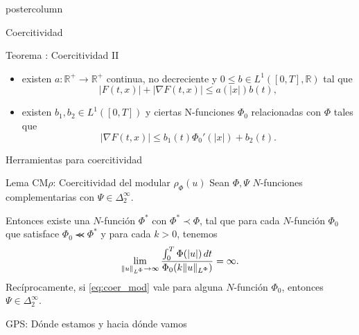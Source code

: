 \documentclass[final,hyperref={pdfpagelabels=false}]{beamer}
\begin{document}
\begin{frame}
\begin{columns}
\begin{column}{.49\textwidth}
\begin{beamercolorbox}[center,wd=\textwidth]{postercolumn}
\begin{minipage}[T]{.95\textwidth}
{\begin{block}{Coercitividad}
\begin{minipage}[T]{.9\textwidth}
\begin{block}{Teorema \cite{acmaz2015}: Coercitividad II}
\begin{itemize}
\item existen $a:\mathbb{R}^+\to \mathbb{R}^+$ continua, no decreciente y $0\leq b \in L^{1}([0,T],\mathbb{R})$ tal que 
\begin{equation}\label{item:condicion_cya}
|F(t,x)|+|\nabla F(t,x)|\leq a(|x|)b(t),\tag{$C\; y\; A$}
\end{equation}
\item existen $b_1,b_2 \in L^1([0,T])$ y ciertas N-funciones $\Phi_0$ relacionadas con $\Phi$ tales que 
\begin{equation}\label{holder_cont-mu}
  \left| \nabla F(t,x) \right|\leq b_1(t)\Phi_0'(|x|)+b_2(t).
  \tag{$A_5$}
\end{equation}
\end{itemize}
\end{block}
\end{minipage}
\end{block}




\begin{block}{Herramientas para coercitividad}
	\begin{minipage}[T]{.9\textwidth}
	\begin{block}{Lema CM$\rho$: Coercitividad del modular $\rho_{\Phi}(u)$}
	\label{lem_coer}
	Sean  $\Phi,\Psi$  $N$-funciones complementarias con $\Psi \in \Delta_2^{\infty}$. 

Entonces existe una $N$-funci\'on $\Phi^*$ con $\Phi^*\prec\Phi$,
tal que para cada $N$-funci\'on $\Phi_0$ que satisface 
$\Phi_0\llcurly\Phi^*$ 
y para cada 
$k>0$, tenemos
\begin{equation}\label{eq:coer_mod}
\lim\limits_{\|u\|_{L^{\Phi}}\to \infty}
\frac{\int_0^T \Phi(|u|)\,dt}{\Phi_0(k\|u\|_{L^{\Phi}})}=\infty.
\end{equation}
Rec\'iprocamente, si  \eqref{eq:coer_mod} vale para alguna $N$-funci\'on $\Phi_0$,  entonces $\Psi\in\Delta_2^{\infty}$.
	\end{block}
	\end{minipage}
	\end{block}



\begin{block}{GPS: Dónde estamos y hacia dónde vamos}
\begin{minipage}[T]{.9\textwidth}


\end{minipage}
\end{block}}
\end{minipage}
\end{beamercolorbox}
\end{column}
\end{columns}
\end{frame}
\end{document}
